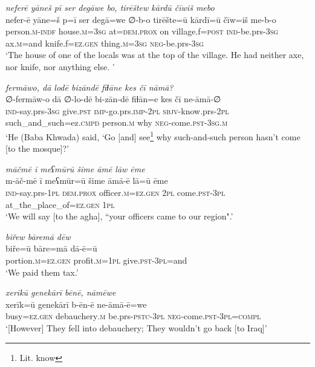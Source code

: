 \ea \label{BP.71}
\textit{neferē yāneš pī ser degāwe bo, tirēštew kārdū čīwiš mebo} \\ 
\gll nefer-ē yāne=š p=ī ser degā=we ∅-b-o tirēšte=ū kārdī=ū čīw=iš me-b-o \\ 
 person\textsc{.m}\textsc{-indf} house\textsc{.m}\textsc{=3sg} at=\textsc{dem.prox} on village.f\textsc{=\textsc{post}} \textsc{ind-}be.prs\textsc{-3sg} ax\textsc{.m}=and knife.f\textsc{=ez.gen} thing\textsc{.m}\textsc{=3sg} \textsc{neg-}be.prs\textsc{-3sg} \\ 
\glt `The house of one of the locals was at the top of the village. He had neither axe, nor knife, nor anything else. '
\z 
 
\ea \label{BP.77}
\textit{fermāwo, dā lodē bizāndē fiɫāne kes čī nāmā?} \\ 
\gll ∅-fermāw-o dā ∅-lo-dē bi-zān-dē fiɫān=e kes čī ne-āmā-∅ \\ 
 \textsc{ind-}say.prs\textsc{-3sg} give\textsc{.pst} \textsc{imp-}go.prs.\textsc{imp-}\textsc{2pl} \textsc{sbjv-}know.prs-\textsc{2pl} such\_and\_such=ez\textsc{.cmpd} person\textsc{.m} why \textsc{neg-}come\textsc{.pst}\textsc{-3sg}\textsc{.m} \\ 
\glt `He (Baba Khwada) said, ‘Go [and] see\footnote{Lit. know} why such-and-such person hasn’t come [to the mosque]?'
\z 
 
\ea \label{BP.90}
\textit{māčmē ī meʕmūrū šime āmē lāw ēme} \\ 
\gll m-āč-mē ī meʕmūr=ū šime āmā-ē lā=ū ēme \\ 
 \textsc{ind-}say.prs\textsc{-\textsc{1pl}} \textsc{dem.prox} officer\textsc{.m}\textsc{=ez.gen} \textsc{2pl} come\textsc{.pst}\textsc{-3pl} at\_the\_place\_of\textsc{=ez.gen} \textsc{1pl} \\ 
\glt `We will say [to the agha], “your officers came to our region".'
\z 
 
\ea \label{BP.91}
\textit{biřew bāremā dēw} \\ 
\gll biře=ū bāre=mā dā-ē=ū \\ 
 portion\textsc{.m}\textsc{=ez.gen} profit\textsc{.m}\textsc{=\textsc{1pl}} give\textsc{.pst}\textsc{-3pl}=and \\ 
\glt `We paid them tax.'
\z 
 
\ea \label{BP.93}
\textit{xerīkū genekārī bēnē, nāmēwe} \\ 
\gll xerīk=ū genekārī b-ēn-ē ne-āmā-ē=we \\ 
 busy\textsc{=ez.gen} debauchery\textsc{.m} be.prs\textsc{-pstc}\textsc{-3pl} \textsc{neg-}come\textsc{.pst}\textsc{-3pl}\textsc{=compl} \\ 
\glt `[However] They fell into debauchery; They wouldn’t go back [to Iraq]'
\z 
 
